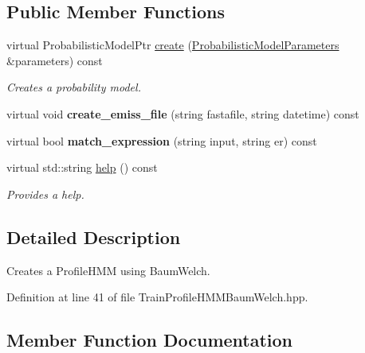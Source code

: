 \subsection*{Public Member Functions}
\begin{DoxyCompactItemize}
\item 
virtual Probabilistic\+Model\+Ptr \hyperlink{classtops_1_1TrainProfileHMMBaumWelch_a90acae2f12580eeb2f2010c5321fd6f9}{create} (\hyperlink{classtops_1_1ProbabilisticModelParameters}{Probabilistic\+Model\+Parameters} \&parameters) const
\begin{DoxyCompactList}\small\item\em Creates a probability model. \end{DoxyCompactList}\item 
\mbox{\label{classtops_1_1TrainProfileHMMBaumWelch_a4d824746aca1e5b0173f602d86d79023}} 
virtual void {\bfseries create\+\_\+emiss\+\_\+file} (string fastafile, string datetime) const
\item 
\mbox{\label{classtops_1_1TrainProfileHMMBaumWelch_ad082b3be1832ef93949e3ffe9a5d90b4}} 
virtual bool {\bfseries match\+\_\+expression} (string input, string er) const
\item 
\mbox{\label{classtops_1_1TrainProfileHMMBaumWelch_a99829c7981fcdf582840a4a235d59e33}} 
virtual std\+::string \hyperlink{classtops_1_1TrainProfileHMMBaumWelch_a99829c7981fcdf582840a4a235d59e33}{help} () const
\begin{DoxyCompactList}\small\item\em Provides a help. \end{DoxyCompactList}\end{DoxyCompactItemize}


\subsection{Detailed Description}
Creates a Profile\+H\+MM using Baum\+Welch. 

Definition at line 41 of file Train\+Profile\+H\+M\+M\+Baum\+Welch.\+hpp.



\subsection{Member Function Documentation}
\mbox{\label{classtops_1_1TrainProfileHMMBaumWelch_a90acae2f12580eeb2f2010c5321fd6f9}} 
